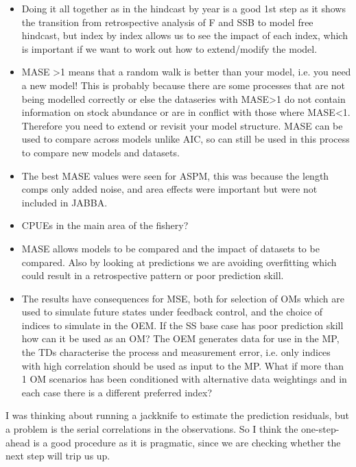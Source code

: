 \begin{itemize}
    \item Doing it all together as in the hindcast by year is a good 1st step as it shows the transition from retrospective analysis of F and SSB to model free hindcast, but index by index allows us to see the impact of each index, which is important if we want to work out how to extend/modify the model.
    
    \item  MASE >1 means that a random walk is better than your model, i.e. you need a new model! This is probably because there are some processes that are not being modelled correctly or else the dataseries with MASE>1 do not contain information on stock abundance or are in conflict with those where MASE<1. Therefore you need to extend or revisit your model structure. MASE can be used to compare across models unlike AIC, so can still be used in this process to compare new models and datasets. 
    
    \item The best MASE values were seen for ASPM, this was because the length comps only added noise, and area effects were important but were not included in JABBA. 
    
    \item CPUEs in the main area of the fishery?%
    
    \item MASE allows models to be compared and the impact of datasets to be compared. Also by looking at predictions we are avoiding overfitting which could result in a retrospective pattern or poor prediction skill.
    
  \item The results have consequences for MSE, both for selection of OMs  which are used to simulate future states under feedback control, and the choice of indices to simulate in the OEM. If the SS base case has poor prediction skill how can it be used as an OM? The OEM generates data for use in the MP, the TDs characterise the process and measurement error, i.e. only indices with high correlation should be used as input to the MP. What if more than 1 OM scenarios has been conditioned with alternative data weightings and in each case there is a different preferred index? 
  
\end{itemize}

\iffalse

I was thinking about running a jackknife to estimate the prediction residuals, but a problem is the serial correlations in the observations. So I think the one-step-ahead is a good procedure as it is pragmatic, since we are checking whether the next step will trip us up.

